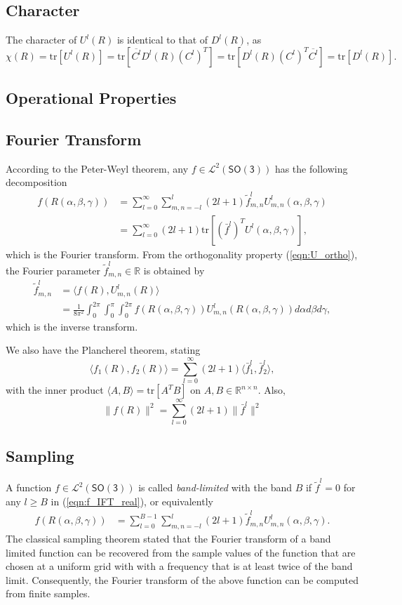 \documentclass[onecolumn,11pt]{IEEEtran}
\newcommand{\pair}[1]{\ensuremath{\langle #1 \rangle}}
\newcommand{\refeqn}[1]{(\ref{eqn:#1})}
\newcommand{\trs}[1]{\mathrm{tr}\ensuremath{[#1]}}
\newcommand{\SO}{\ensuremath{\mathsf{SO(3)}}}
\renewcommand{\Re}{\ensuremath{\mathbb{R}}}
\begin{document}
\subsection{Character}

The character of $U^l(R)$ is identical to that of $D^l(R)$, as
\[
    \chi(R) = \trs{U^l(R)} = \trs{ \overline{C^l} D^l(R) (C^l)^T } = \trs{D^l(R) (C^l)^T \overline{C^l}} = \trs{D^l(R)}.
\]

\subsection{Operational Properties}
\subsection{Fourier Transform}
According to the Peter-Weyl theorem, any $f\in\mathcal{L}^2(\SO)$ has the following decomposition
\begin{align}
f(R(\alpha,\beta,\gamma)) &= \sum_{l=0}^\infty \sum_{m,n=-l}^l (2l+1)\tilde f^l_{m,n} U^l_{m,n}(\alpha,\beta,\gamma)\nonumber\\
                          &= \sum_{l=0}^\infty (2l+1)\trs{(\bar f^l)^T U^l(\alpha,\beta,\gamma)},\label{eqn:f_IFT_real}
\end{align}
which is the Fourier transform. 
From the orthogonality property \refeqn{U_ortho}, the Fourier parameter $\tilde f^l_{m,n}\in\Re$ is obtained by
\begin{align}
    \tilde f^l_{m,n} &= \pair{ f(R), U^l_{m,n}(R)}\nonumber\\
                     & =\frac{1}{8\pi^2}\int_0^{2\pi}\int_{0}^\pi\int_0^{2\pi} f(R(\alpha,\beta,\gamma)) {U^{l}_{m,n}(R(\alpha,\beta,\gamma))}d\alpha d\beta d\gamma,\label{eqn:f_FT_real}
\end{align}
which is the inverse transform. 

We also have the Plancherel theorem, stating
\[
\pair{f_1(R), f_2(R)} = \sum_{l=0}^\infty (2l+1)\pair{\bar f_1^l, \bar f_2^l},
\]
with the inner product $\pair{A,B}=\trs{A^TB}$ on $A,B\in\Re^{n\times n}$. Also, 
\[
\| f(R)\|^2 = \sum_{l=0}^\infty (2l+1)\|\bar f^l\|^2
\]

\subsection{Sampling}

A function $f\in\mathcal{L}^2(\SO)$ is called \textit{band-limited} with the band $B$ if $\tilde f^l=0$ for any $l\geq B$ in \refeqn{f_IFT_real}, or equivalently
\begin{align}
f(R(\alpha,\beta,\gamma)) &= \sum_{l=0}^{B-1} \sum_{m,n=-l}^l (2l+1)\tilde f^l_{m,n} U^l_{m,n}(\alpha,\beta,\gamma).\label{eqn:fB_real}
\end{align}
The classical sampling theorem stated that the Fourier transform of a band limited function can be recovered from the sample values of the function that are chosen at a uniform grid with with a frequency that is at least twice of the band limit. 
Consequently, the Fourier transform of the above function can be computed from finite samples. 
\end{document}
